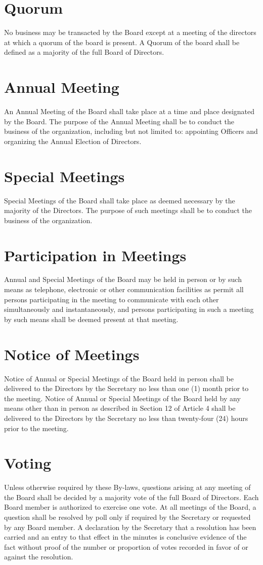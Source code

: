 \documentclass[10pt, english]{xorgdocs}
\begin{document}
\section{Quorum}
No business may be transacted by the Board except at a meeting of the directors
at which a quorum of the board is present. A Quorum of the board shall be
defined as a majority of the full Board of Directors.

\section{Annual Meeting}
An Annual Meeting of the Board shall take place at a time and place designated
by the Board.  The purpose of the Annual Meeting shall be to conduct the
business of the organization, including but not limited to: appointing Officers
and organizing the Annual Election of Directors.

\section{Special Meetings}
Special Meetings of the Board shall take place as deemed necessary by the
majority of the Directors.  The purpose of such meetings shall be to conduct
the business of the organization.

\section{Participation in Meetings}
Annual and Special Meetings of the Board may be held in person or by such means
as telephone, electronic or other communication facilities as permit all persons
participating in the meeting to communicate with each other simultaneously and
instantaneously, and persons participating in such a meeting by such means shall
be deemed present at that meeting.

\section{Notice of Meetings}
Notice of Annual or Special Meetings of the Board held in person shall be
delivered to the Directors by the Secretary no less than one (1) month prior to
the meeting.  Notice of Annual or Special Meetings of the Board held by any
means other than in person as described in Section 12 of Article 4 shall be
delivered to the Directors by the Secretary no less than twenty-four (24) hours
prior to the meeting.

\section{Voting}
Unless otherwise required by these By-laws, questions arising at any meeting of
the Board shall be decided by a majority vote of the full Board of Directors.
Each Board member is authorized to exercise one vote. At all meetings of the
Board, a question shall be resolved by poll only if required by the Secretary or
requested by any Board member. A declaration by the Secretary that a resolution
has been carried and an entry to that effect in the minutes is conclusive
evidence of the fact without proof of the number or proportion of votes recorded
in favor of or against the resolution.
\end{document}

